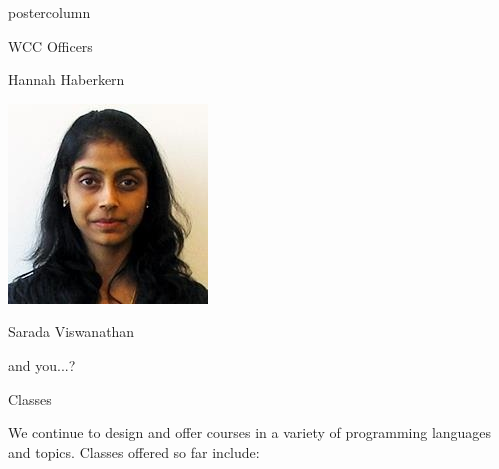 \documentclass{beamer}
\begin{document}
\begin{frame}
\begin{columns}
\begin{column}{.33\textwidth}
\begin{beamercolorbox}[center,wd=\textwidth]{postercolumn}
\begin{minipage}[T]{.95\textwidth}
{\begin{myblock}{WCC Officers}
\begin{addmargin}[1em]{1em}
\begin{minipage}{0.3\linewidth}
                                \centerline{Hannah Haberkern}
                            \end{minipage}
                            \hspace{0.1cm}
                            \begin{minipage}{0.3\linewidth}
                                \includegraphics[width=\linewidth]{img/sarada.jpg}
                                \centerline{Sarada Viswanathan}
                            \end{minipage}
                            \begin{addmargin}[.5em]{.5em}
                                \vspace{.75cm}
                                \centerline{and you...?} 
                                \end{addmargin}
                            \end{addmargin}
                    \end{myblock}
                    \vspace{1.25cm}
                    \begin{myblock}{Classes}
                        \begin{addmargin}[1em]{1em}
                            We continue to design and offer courses in a variety of programming languages and topics. Classes offered so far include: 

\end{addmargin}
\end{myblock}}
\end{minipage}
\end{beamercolorbox}
\end{column}
\end{columns}
\end{frame}
\end{document}
